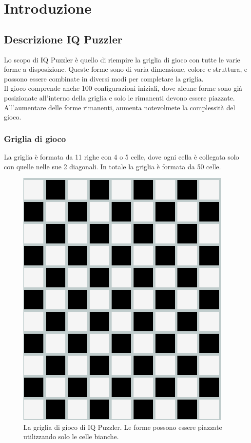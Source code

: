 
\chapter{Introduzione}
\label{cap:introduzione}
\section{Descrizione IQ Puzzler}
Lo scopo di IQ Puzzler è quello di riempire la griglia di gioco con tutte le varie forme a disposizione. Queste forme sono di varia dimensione, colore e struttura, e possono essere combinate in diversi modi per completare la griglia.\\
Il gioco comprende anche 100 configurazioni iniziali, dove alcune forme sono già posizionate all'interno della griglia e solo le rimanenti devono essere piazzate. All'aumentare delle forme rimanenti, aumenta notevolmete la complessità del gioco.\\ 
\subsection{Griglia di gioco}
La griglia è formata da 11 righe con 4 o 5 celle, dove ogni cella è collegata solo con quelle nelle sue 2 diagonali. In totale la griglia è formata da 50 celle.

\begin{figure}[h]
	\centering
	\includegraphics[scale=0.4]{immagini/griglia}
	\caption{La griglia di gioco di IQ Puzzler. Le forme possono essere piazzate utilizzando solo le celle bianche.}
	\label{fig:griglia}
\end{figure}

